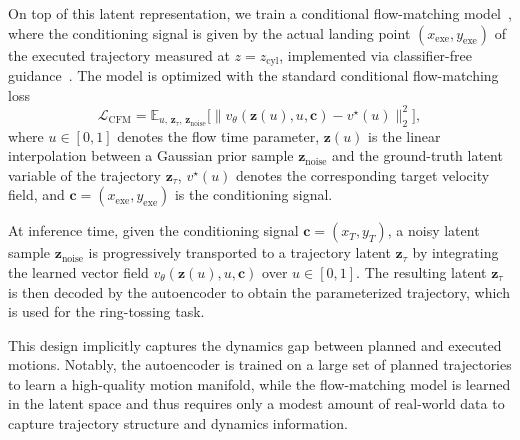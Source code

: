 \documentclass[letterpaper, 10 pt, conference]{ieeeconf}  %
\begin{document}
On top of this latent representation, we train a conditional flow-matching model~\cite{lipman2023flowmatchinggenerativemodeling, liu2022rectifiedflow, albergo2024stochasticinterpolants, lipman2024flowmatchingguide}, 
where the conditioning signal is given by the actual landing point $(x_{\mathrm{exe}}, y_{\mathrm{exe}})$ of the executed trajectory measured at $z=z_{\mathrm{cyl}}$, implemented via classifier-free guidance~\cite{ho2022classifierfreediffusionguidance}. 
The model is optimized with the standard conditional flow-matching loss
\begin{equation}
\mathcal{L}_{\mathrm{CFM}} 
= \mathbb{E}_{u,\,\mathbf{z}_\tau,\,\mathbf{z}_{\text{noise}}} 
\big[ \| v_\theta(\mathbf{z}(u), u, \mathbf{c}) - v^\star(u) \|_2^2 \big],
\end{equation}
where $u \in [0,1]$ denotes the flow time parameter, 
$\mathbf{z}(u)$ is the linear interpolation between a Gaussian prior sample $\mathbf{z}_{\text{noise}}$ and the ground-truth latent variable of the trajectory $\mathbf{z}_\tau$, 
$v^\star(u)$ denotes the corresponding target velocity field, 
and $\mathbf{c}=(x_{\mathrm{exe}}, y_{\mathrm{exe}})$ is the conditioning signal.

At inference time, given the conditioning signal $\mathbf{c}=(x_T, y_T)$, a noisy latent sample $\mathbf{z}_{\text{noise}}$ is progressively transported to a trajectory latent $\mathbf{z}_\tau$ by integrating the learned vector field $v_\theta(\mathbf{z}(u), u, \mathbf{c})$ over $u \in [0,1]$. The resulting latent $\mathbf{z}_\tau$ is then decoded by the autoencoder to obtain the parameterized trajectory, which is used for the ring-tossing task.

This design implicitly captures the dynamics gap between planned and executed motions. 
Notably, the autoencoder is trained on a large set of planned trajectories to learn a high-quality motion manifold, 
while the flow-matching model is learned in the latent space and thus requires only a modest amount of real-world data to capture trajectory structure and dynamics information.
\end{document}
